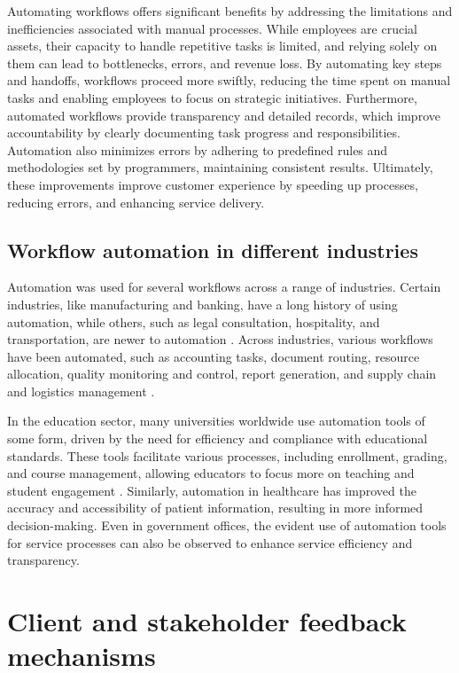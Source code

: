 Automating workflows offers significant benefits by addressing the limitations and inefficiencies associated with manual processes. While employees are crucial assets, their capacity to handle repetitive tasks is limited, and relying solely on them can lead to bottlenecks, errors, and revenue loss. By automating key steps and handoffs, workflows proceed more swiftly, reducing the time spent on manual tasks and enabling employees to focus on strategic initiatives. Furthermore, automated workflows provide transparency and detailed records, which improve accountability by clearly documenting task progress and responsibilities. Automation also minimizes errors by adhering to predefined rules and methodologies set by programmers, maintaining consistent results. Ultimately, these improvements improve customer experience by speeding up processes, reducing errors, and enhancing service delivery. 

\subsection{Workflow automation in different industries}

Automation was used for several workflows across a range of industries. Certain industries, like manufacturing and banking, have a long history of using automation, while others, such as legal consultation, hospitality, and transportation, are newer to automation \cite{caban2021}. Across industries, various workflows have been automated, such as accounting tasks, document routing, resource allocation, quality monitoring and control, report generation, and supply chain and logistics management \cite{aguirre2017, mcquilken2014}.

In the education sector, many universities worldwide use automation tools of some form, driven by the need for efficiency and compliance with educational standards. These tools facilitate various processes, including enrollment, grading, and course management, allowing educators to focus more on teaching and student engagement \cite{choudhary2024}. Similarly, automation in healthcare has improved the accuracy and accessibility of patient information, resulting in more informed decision-making. Even in government offices, the evident use of automation tools for service processes can also be observed to enhance service efficiency and transparency. 


\section{Client and stakeholder feedback mechanisms}

